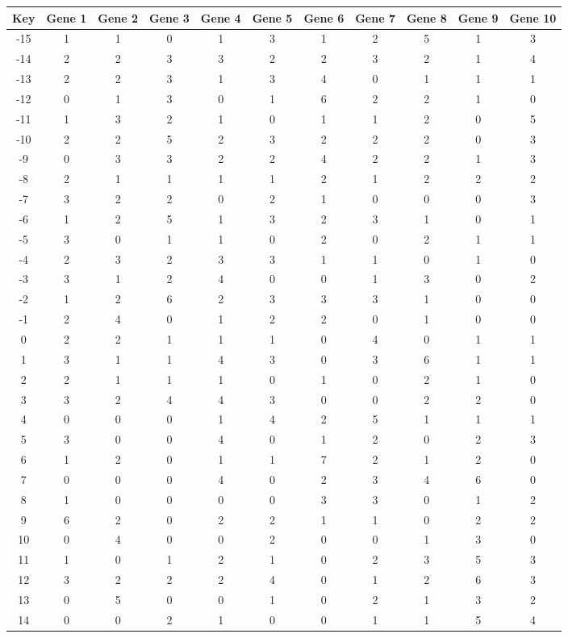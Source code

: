 \begin{tabular}{|c|c|c|c|c|c|c|c|c|c|c|}
\hline
Key & Gene 1 & Gene 2 & Gene 3 & Gene 4 & Gene 5 & Gene 6 & Gene 7 & Gene 8 & Gene 9 & Gene 10 \\
\hline
-15 & 1 & 1 & 0 & 1 & 3 & 1 & 2 & 5 & 1 & 3 \\
-14 & 2 & 2 & 3 & 3 & 2 & 2 & 3 & 2 & 1 & 4 \\
-13 & 2 & 2 & 3 & 1 & 3 & 4 & 0 & 1 & 1 & 1 \\
-12 & 0 & 1 & 3 & 0 & 1 & 6 & 2 & 2 & 1 & 0 \\
-11 & 1 & 3 & 2 & 1 & 0 & 1 & 1 & 2 & 0 & 5 \\
-10 & 2 & 2 & 5 & 2 & 3 & 2 & 2 & 2 & 0 & 3 \\
-9 & 0 & 3 & 3 & 2 & 2 & 4 & 2 & 2 & 1 & 3 \\
-8 & 2 & 1 & 1 & 1 & 1 & 2 & 1 & 2 & 2 & 2 \\
-7 & 3 & 2 & 2 & 0 & 2 & 1 & 0 & 0 & 0 & 3 \\
-6 & 1 & 2 & 5 & 1 & 3 & 2 & 3 & 1 & 0 & 1 \\
-5 & 3 & 0 & 1 & 1 & 0 & 2 & 0 & 2 & 1 & 1 \\
-4 & 2 & 3 & 2 & 3 & 3 & 1 & 1 & 0 & 1 & 0 \\
-3 & 3 & 1 & 2 & 4 & 0 & 0 & 1 & 3 & 0 & 2 \\
-2 & 1 & 2 & 6 & 2 & 3 & 3 & 3 & 1 & 0 & 0 \\
-1 & 2 & 4 & 0 & 1 & 2 & 2 & 0 & 1 & 0 & 0 \\
0 & 2 & 2 & 1 & 1 & 1 & 0 & 4 & 0 & 1 & 1 \\
1 & 3 & 1 & 1 & 4 & 3 & 0 & 3 & 6 & 1 & 1 \\
2 & 2 & 1 & 1 & 1 & 0 & 1 & 0 & 2 & 1 & 0 \\
3 & 3 & 2 & 4 & 4 & 3 & 0 & 0 & 2 & 2 & 0 \\
4 & 0 & 0 & 0 & 1 & 4 & 2 & 5 & 1 & 1 & 1 \\
5 & 3 & 0 & 0 & 4 & 0 & 1 & 2 & 0 & 2 & 3 \\
6 & 1 & 2 & 0 & 1 & 1 & 7 & 2 & 1 & 2 & 0 \\
7 & 0 & 0 & 0 & 4 & 0 & 2 & 3 & 4 & 6 & 0 \\
8 & 1 & 0 & 0 & 0 & 0 & 3 & 3 & 0 & 1 & 2 \\
9 & 6 & 2 & 0 & 2 & 2 & 1 & 1 & 0 & 2 & 2 \\
10 & 0 & 4 & 0 & 0 & 2 & 0 & 0 & 1 & 3 & 0 \\
11 & 1 & 0 & 1 & 2 & 1 & 0 & 2 & 3 & 5 & 3 \\
12 & 3 & 2 & 2 & 2 & 4 & 0 & 1 & 2 & 6 & 3 \\
13 & 0 & 5 & 0 & 0 & 1 & 0 & 2 & 1 & 3 & 2 \\
14 & 0 & 0 & 2 & 1 & 0 & 0 & 1 & 1 & 5 & 4 \\
\hline
\end{tabular}